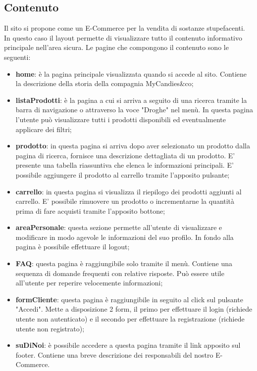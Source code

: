 \subsection{Contenuto}
Il sito si propone come un E-Commerce per la vendita di sostanze stupefacenti. In questo caso il layout  permette di visualizzare tutto il contenuto informativo principale nell'area sicura.
Le pagine che compongono il contenuto sono le seguenti:
\begin{itemize}
    \item \textbf{home}: è la pagina principale visualizzata quando si accede al sito. Contiene la descrizione della storia della compagnia MyCandies\&co;
    \item \textbf{listaProdotti}: è la pagina a cui si arriva a seguito di una ricerca tramite la barra di navigazione o attraverso la voce "Droghe" nel menù. In questa pagina l'utente può visualizzare tutti i prodotti disponibili ed eventualmente applicare dei filtri;
    \item \textbf{prodotto}: in questa pagina si arriva dopo aver selezionato un prodotto dalla pagina di ricerca, fornisce una descrizione dettagliata di un prodotto. E' presente una tabella riassuntiva che elenca le informazioni principali. E' possibile aggiungere il prodotto al carrello tramite l'apposito pulsante;
    \item \textbf{carrello}: in questa pagina si visualizza il riepilogo dei prodotti aggiunti al carrello. E' possibile rimuovere un prodotto o incrementarne la quantità prima di fare acquisti tramite l'apposito bottone;
    \item \textbf{areaPersonale}: questa sezione permette all'utente di visualizzare e modificare in modo agevole le informazioni del suo profilo. In fondo alla pagina è possibile effettuare il logout;
    \item \textbf{FAQ}: questa pagina è raggiungibile solo tramite il menù. Contiene una sequenza di domande frequenti con relative risposte. Può essere utile all'utente per reperire velocemente informazioni;
    \item \textbf{formCliente}: questa pagina è raggiungibile in seguito al click sul pulsante "Accedi". Mette a disposizione 2 form, il primo per effettuare il login (richiede utente non autenticato) e il secondo per effettuare la registrazione (richiede utente non registrato);
    \item \textbf{suDiNoi}: è possibile accedere a questa pagina tramite il link apposito sul footer. Contiene una breve descrizione dei responsabili del nostro E-Commerce. 
\end{itemize}
